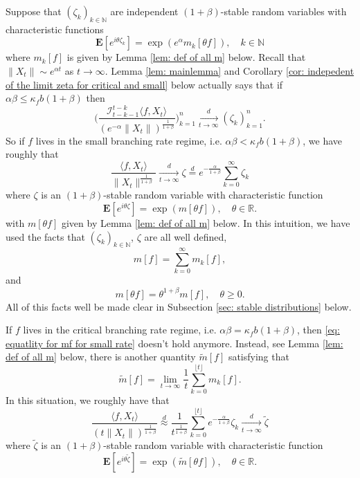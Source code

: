 \documentclass[12pt,a4paper]{amsart}
\theoremstyle{plain}
\theoremstyle{definition}
\numberwithin{equation}{section}
\begin{document}
    Suppose that $(\zeta_k)_{k \in \mathbb N}$ are independent $(1+\beta)$-stable random variables with characteristic functions
\[
    \mathbf E[e^{i\theta \zeta_k}] = \exp(e^\alpha m_k[\theta f]),\quad k \in \mathbb N
\]   
    where $m_k[f]$ is given by Lemma \ref{lem: def of all m} below.
    Recall that $\|X_t\|\sim e^{\alpha t}$ as $t\to\infty$.
    Lemma \ref{lem: mainlemma} and Corollary \ref{cor: indepedent of the limit zeta for critical and small} below actually says that if $\alpha\beta \leq \kappa_f b(1+\beta) $ then
\[
    \bigg(\frac{\mathcal I^{t-k}_{t-k-1}\langle f,X_t\rangle}{(e^{-\alpha}\|X_t\|)^{\frac{1}{1+\beta}}}\bigg)_{k=1}^n 
    \xrightarrow [t\to \infty]{d} (\zeta_k)_{k=1}^n.
\]
    So if $f$ lives in the small branching rate regime, i.e. $\alpha \beta < \kappa_f b(1+\beta)$, we have roughly that
\[
    \frac{\langle f,X_t\rangle}{\|X_t\|^{\frac{1}{1+\beta}}} \xrightarrow[t\to \infty]{d} \zeta\overset{d}{=}e^{-\frac{\alpha}{1+\beta}}\sum_{k=0}^\infty \zeta_k
\]
    where $\zeta$ is an $(1+\beta)$-stable random variable with characteristic function
\[
    \mathbf E[e^{i\theta \zeta}] = \exp(m[\theta f]),\quad \theta \in \mathbb R.
\]
    with $m[\theta f]$ given by Lemma \ref{lem: def of all m} below. 
    In this intuition, we have used the facts that $(\zeta_k)_{k\in \mathbb N}$, $\zeta$ are all well defined,
\begin{equation}
\label{eq: equatlity for mf for small rate}
    m[f] =  \sum_{k=0}^\infty m_k[ f],
\end{equation}
    and 
\[
    m[\theta f] = \theta^{1+\beta} m[f], \quad \theta \geq 0.
\]
    All of this facts well be made clear in Subsection \ref{sec: stable distributions} below.

    If $f$ lives in the critical branching rate regime, i.e. $\alpha \beta = \kappa_f b(1+\beta)$, then \eqref{eq: equatlity for mf for small rate} doesn't hold anymore. 
    Instead, see Lemma \ref{lem: def of all m} below, there is another quantity $\widetilde m[f]$ satisfying that
\[
    \widetilde{m}[f] = \lim_{t\rightarrow \infty}\frac{1}{t}\sum_{k=0}^{\lfloor t \rfloor}m_k[f].
\]
    In this situation, we roughly have that
\[
    \frac{\langle f,X_t\rangle}{(t\|X_t\|)^{\frac{1}{1+\beta}}} \overset{d}{\approx} \frac{1}{t^{\frac{1}{1+\beta}}} \sum_{k=0}^{\lfloor t\rfloor} e^{- \frac{\alpha}{1+\beta}} \zeta_k \xrightarrow[t\to \infty]{d} \widetilde \zeta 
\]
    where $\widetilde \zeta$ is an $(1+\beta)$-stable random variable with characteristic function
\[
    \mathbf E[e^{i\theta \widetilde \zeta}] = \exp(\widetilde m[\theta f]),\quad \theta \in \mathbb R.
\]
    
\end{document}
